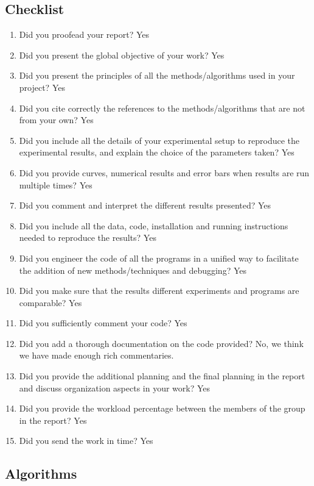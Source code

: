 \documentclass[a4paper, 11pt]{article}
\begin{document}
\subsection{Checklist}
\begin{enumerate}
    \item Did you proofead your report? Yes
    \item Did you present the global objective of your work? Yes
    \item Did you present the principles of all the methods/algorithms used in your project? Yes
    \item Did you cite correctly the references to the methods/algorithms that are not from your own? Yes
    \item Did you include all the details of your experimental setup to reproduce the experimental results, and explain the choice of the parameters taken? Yes
    \item Did you provide curves, numerical results and error bars when results are run multiple times? Yes
    \item Did you comment and interpret the different results presented? Yes
    \item Did you include all the data, code, installation and running instructions needed to reproduce the results? Yes
    \item Did you engineer the code of all the programs in a unified way to facilitate the addition of new methods/techniques and debugging? Yes
    \item Did you make sure that the results different experiments and programs are comparable? Yes
    \item Did you sufficiently comment your code? Yes
    \item Did you add a thorough documentation on the code provided? No, we think we have made enough rich commentaries.
    \item Did you provide the additional planning and the final planning in the report and discuss organization aspects in your work? Yes
    \item Did you provide the workload percentage between the members of the group in the report? Yes
    \item Did you send the work in time? Yes
\end{enumerate}

\newpage

\subsection{Algorithms}
\end{document}
